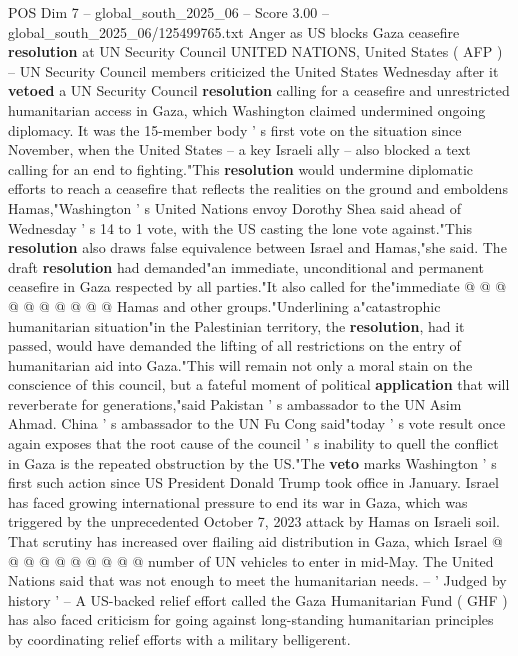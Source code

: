 \begin{textsample}{POS Dim 7 – global\_south\_2025\_06 – Score 3.00 – global\_south\_2025\_06/125499765.txt}  \label{ex:f7_pos_171}
Anger as US blocks Gaza ceasefire \textbf{resolution} at UN Security Council UNITED NATIONS, United States ( AFP ) -- UN Security Council members criticized the United States Wednesday after it \textbf{vetoed} a UN Security Council \textbf{resolution} calling for a ceasefire and unrestricted humanitarian access in Gaza, which Washington claimed undermined ongoing diplomacy.
It was the 15-member body ' s first vote on the situation since November, when the United States -- a key Israeli ally -- also blocked a text calling for an end to fighting."This \textbf{resolution} would undermine diplomatic efforts to reach a ceasefire that reflects the realities on the ground and emboldens Hamas,"Washington ' s United Nations envoy Dorothy Shea said ahead of Wednesday ' s 14 to 1 vote, with the US casting the lone vote against."This \textbf{resolution} also draws false equivalence between Israel and Hamas,"she said.
The draft \textbf{resolution} had demanded"an immediate, unconditional and permanent ceasefire in Gaza respected by all parties."It also called for the"immediate @ @ @ @ @ @ @ @ @ @ Hamas and other groups."Underlining a"catastrophic humanitarian situation"in the Palestinian territory, the \textbf{resolution}, had it passed, would have demanded the lifting of all restrictions on the entry of humanitarian aid into Gaza."This will remain not only a moral stain on the conscience of this council, but a fateful moment of political \textbf{application} that will reverberate for generations,"said Pakistan ' s ambassador to the UN Asim Ahmad.
China ' s ambassador to the UN Fu Cong said"today ' s vote result once again exposes that the root cause of the council ' s inability to quell the conflict in Gaza is the repeated obstruction by the US."The \textbf{veto} marks Washington ' s first such action since US President Donald Trump took office in January.
Israel has faced growing international pressure to end its war in Gaza, which was triggered by the unprecedented October 7, 2023 attack by Hamas on Israeli soil.
That scrutiny has increased over flailing aid distribution in Gaza, which Israel @ @ @ @ @ @ @ @ @ @ number of UN vehicles to enter in mid-May.
The United Nations said that was not enough to meet the humanitarian needs. -- ' Judged by history ' -- A US-backed relief effort called the Gaza Humanitarian Fund ( GHF ) has also faced criticism for going against long-standing humanitarian principles by coordinating relief efforts with a military belligerent.

\end{textsample}
